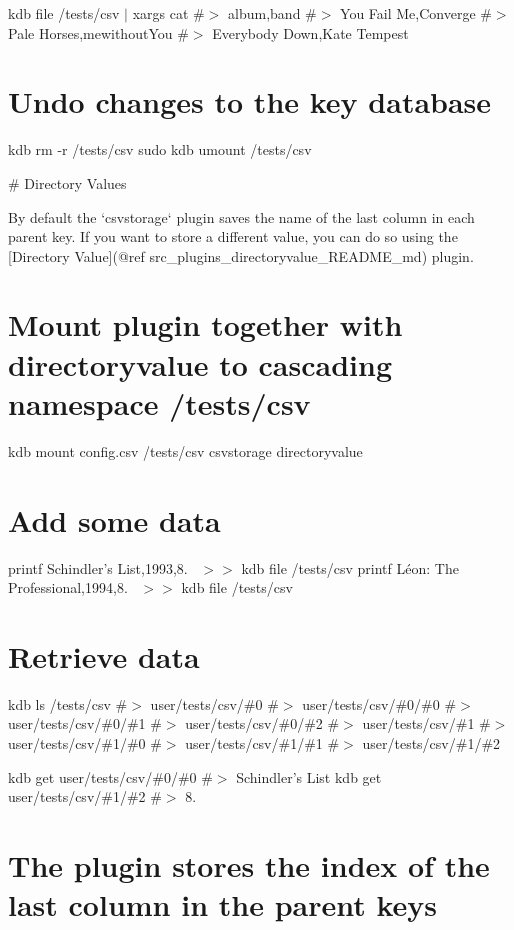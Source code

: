 kdb file /tests/csv $\vert$ xargs cat \#$>$ album,band \#$>$ You Fail Me,Converge \#$>$ Pale Horses,mewithout\+You \#$>$ Everybody Down,Kate Tempest

\section*{Undo changes to the key database}

kdb rm -\/r /tests/csv sudo kdb umount /tests/csv 
\begin{DoxyCode}
# Directory Values

By default the `csvstorage` plugin saves the name of the last column in each parent key. If you want to
       store a different value, you can do
so using the [Directory Value](@ref src\_plugins\_directoryvalue\_README\_md) plugin.
\end{DoxyCode}
 \section*{Mount plugin together with {\ttfamily directoryvalue} to cascading namespace {\ttfamily /tests/csv}}

kdb mount config.\+csv /tests/csv csvstorage directoryvalue

\section*{Add some data}

printf \textquotesingle{}Schindler’s List,1993,8.~\newline
\textquotesingle{} $>$$>$ {\ttfamily kdb file /tests/csv} printf \textquotesingle{}Léon\+: The Professional,1994,8.~\newline
\textquotesingle{} $>$$>$ {\ttfamily kdb file /tests/csv}

\section*{Retrieve data}

kdb ls /tests/csv \#$>$ user/tests/csv/\#0 \#$>$ user/tests/csv/\#0/\#0 \#$>$ user/tests/csv/\#0/\#1 \#$>$ user/tests/csv/\#0/\#2 \#$>$ user/tests/csv/\#1 \#$>$ user/tests/csv/\#1/\#0 \#$>$ user/tests/csv/\#1/\#1 \#$>$ user/tests/csv/\#1/\#2

kdb get user/tests/csv/\#0/\#0 \#$>$ Schindler’s List kdb get user/tests/csv/\#1/\#2 \#$>$ 8.

\section*{The plugin stores the index of the last column in the parent keys}

